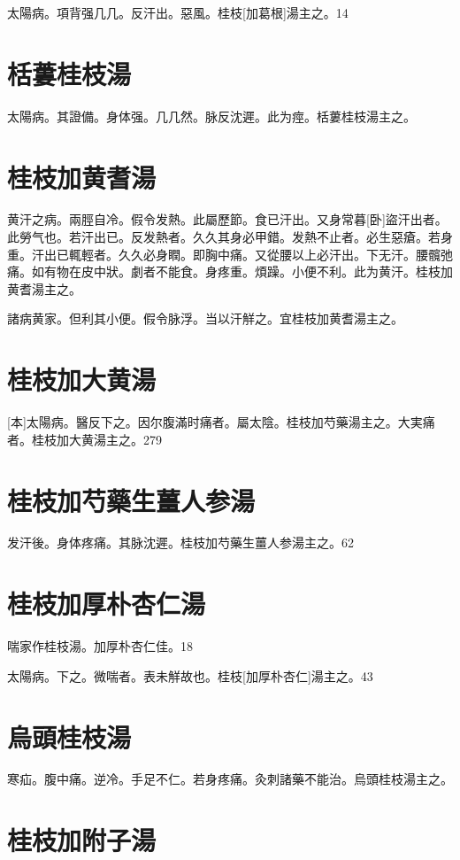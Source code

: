 \documentclass[12pt,twoside,UTF8,b5paper]{ctexbook}
\begin{document}
太陽病。項背强几几。反汗出。惡風。桂枝[加葛根]湯主之。14

\section{栝蔞桂枝湯}

太陽病。其證備。身体强。几几然。脉反沈遲。此为痙。栝蔞桂枝湯主之。

\section{桂枝加黄耆湯}

黄汗之病。兩脛自冷。假令发熱。此屬歷節。食已汗出。又身常暮[卧]盜汗出者。此勞气也。若汗出已。反发熱者。久久其身必甲錯。发熱不止者。必生惡瘡。若身重。汗出已輒輕者。久久必身瞤。即胸中痛。又從腰以上必汗出。下无汗。腰髖弛痛。如有物在皮中狀。劇者不能食。身疼重。煩躁。小便不利。此为黄汗。桂枝加黄耆湯主之。

諸病黄家。但利其小便。假令脉浮。当以汗觧之。宜桂枝加黄耆湯主之。

\section{桂枝加大黄湯}

[本]太陽病。醫反下之。因尔腹滿时痛者。屬太陰。桂枝加芍藥湯主之。大実痛者。桂枝加大黄湯主之。279

\section{桂枝加芍藥生薑人参湯}

发汗後。身体疼痛。其脉沈遲。桂枝加芍藥生薑人参湯主之。62

\section{桂枝加厚朴杏仁湯}

喘家作桂枝湯。加厚朴杏仁佳。18

太陽病。下之。微喘者。表未觧故也。桂枝[加厚朴杏仁]湯主之。43

\section{烏頭桂枝湯}

寒疝。腹中痛。逆冷。手足不仁。若身疼痛。灸刺諸藥不能治。烏頭桂枝湯主之。

\section{桂枝加附子湯}
\end{document}
